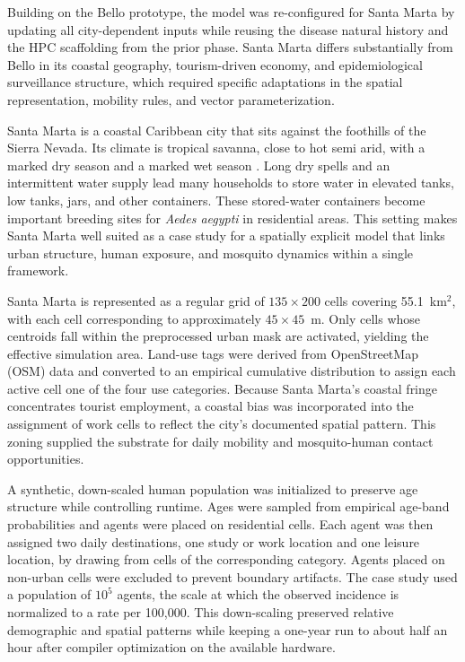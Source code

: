 \documentclass[applsci,article,accept,pdftex,moreauthors]{Definitions/mdpi}
\begin{document}
Building on the Bello prototype, the model was re-configured for Santa Marta by updating all city-dependent inputs while reusing the disease natural history and the HPC scaffolding from the prior phase. Santa Marta differs substantially from Bello in its coastal geography, tourism-driven economy, and epidemiological surveillance structure, which required specific adaptations in the spatial representation, mobility rules, and vector parameterization.

Santa Marta is a coastal Caribbean city that sits against the foothills of the Sierra Nevada. Its climate is tropical savanna, close to hot semi arid, with a marked dry season and a marked wet season \cite{MARTIN2026100164}. Long dry spells and an intermittent water supply lead many households to store water in elevated tanks, low tanks, jars, and other containers. These stored-water containers become important breeding sites for \textit{Aedes aegypti} in residential areas. This setting makes Santa Marta well suited as a case study for a spatially explicit model that links urban structure, human exposure, and mosquito dynamics within a single framework.

Santa Marta is represented as a regular grid of $135 \times 200$ cells covering 55.1~km$^2$, with each cell corresponding to approximately $45 \times 45$~m. Only cells whose centroids fall within the preprocessed urban mask are activated, yielding the effective simulation area. Land-use tags were derived from OpenStreetMap (OSM) data and converted to an empirical cumulative distribution to assign each active cell one of the four use categories. Because Santa Marta's coastal fringe concentrates tourist employment, a coastal bias was incorporated into the assignment of work cells to reflect the city's documented spatial pattern. This zoning supplied the substrate for daily mobility and mosquito-human contact opportunities.

A synthetic, down-scaled human population was initialized to preserve age structure while controlling runtime. Ages were sampled from empirical age-band probabilities and agents were placed on residential cells. Each agent was then assigned two daily destinations, one study or work location and one leisure location, by drawing from cells of the corresponding category. Agents placed on non-urban cells were excluded to prevent boundary artifacts. The case study used a population of $10^5$ agents, the scale at which the observed incidence is normalized to a rate per 100{,}000. This down-scaling preserved relative demographic and spatial patterns while keeping a one-year run to about half an hour after compiler optimization on the available hardware.
\end{document}
